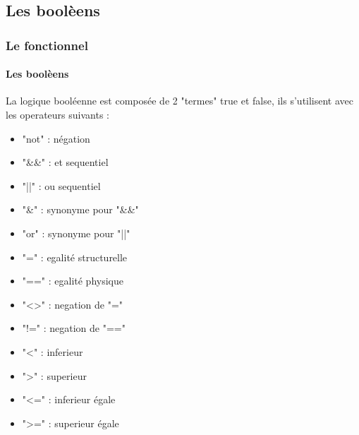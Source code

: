   \subsection{Les boolèens}
\begin{frame}
    \frametitle{Le fonctionnel}
    \framesubtitle{Les boolèens}
      La logique booléenne est composée de 2 "termes" true et false, ils s'utilisent avec les operateurs suivants :
      \begin{center}
      \begin{minipage}[t]{7cm}
	  \begin{itemize}
	    \item "not" : négation
	    \item "\&\&" : et sequentiel
	    \item "||" : ou sequentiel
	    \item "\&" : synonyme pour "\&\&"
	    \item "or" : synonyme pour "||"
	  \end{itemize}
	\end{minipage}
      \end{center}
	\begin{minipage}[t]{5cm}
	  \begin{itemize}
	    \item "=" : egalité structurelle
	    \item "==" : egalité physique
	    \item "<>" : negation de "="
	    \item "!=" : negation de "=="
	  \end{itemize}
	\end{minipage}
	\begin{minipage}[t]{5cm}
	  \begin{itemize}
	    \item "<" : inferieur 
	    \item ">" : superieur
	    \item "<=" : inferieur égale
	    \item ">=" : superieur égale
	  \end{itemize}
	\end{minipage}
\end{frame}


